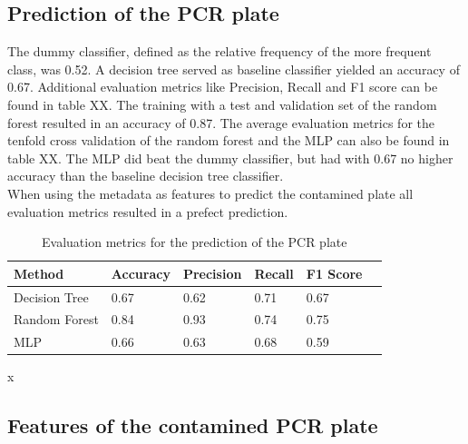 \documentclass{svproc}
\begin{document}
\subsection{Prediction of the PCR plate}
The dummy classifier, defined as the relative frequency of the more frequent class, was 0.52. A decision tree served as baseline classifier yielded an accuracy of 0.67. Additional evaluation metrics like Precision, Recall and F1 score can be found in table XX. The training with a test and validation set of the random forest resulted in an accuracy of 0.87. The average evaluation metrics for the tenfold cross validation of the random forest and the MLP can also be found in table XX. The MLP did beat the dummy classifier, but had with 0.67 no higher accuracy than the baseline decision tree classifier. \\
When using the metadata as features to predict the contamined plate all evaluation metrics resulted in a prefect prediction.
\begin{table}
    \caption{Evaluation metrics for the prediction of the PCR plate}
    \begin{center}
        \begin{tabular}{l@{\quad}lllll}
            \hline
           
                   Method & Accuracy & Precision & Recall & F1 Score\\[2pt]
                                    \hline\rule{0pt}{12pt}
                    Decision Tree  &    0.67 & 0.62 & 0.71 & 0.67 \\
                    Random Forest &    0.84 & 0.93 & 0.74 & 0.75 \\
                    MLP   &    0.66 & 0.63 & 0.68 & 0.59 \\
                    [2pt]
                    \hline
        \end{tabular}
    \end{center}x
    \label{tab1}
\end{table}


\subsection{Features of the contamined PCR plate}
 
\end{document}
